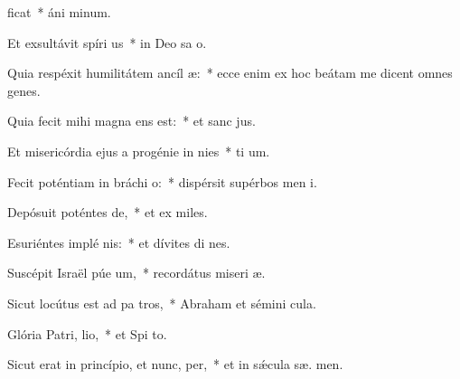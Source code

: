 \item {}ficat~* áni  minum.
\item Et exsultávit spíri us~* in Deo sa o.
\item Quia respéxit humilitátem ancíl æ:~* ecce enim ex hoc beátam me dicent omnes genes.
\item Quia fecit mihi magna  ens est:~* et sanc  jus.
\item Et misericórdia ejus a progénie in nies~* ti um.
\item Fecit poténtiam in bráchi o:~* dispérsit supérbos men  i.
\item Depósuit poténtes  de,~* et ex miles.
\item Esuriéntes implé nis:~* et dívites di nes.
\item Suscépit Israël púe um,~* recordátus miseri æ.
\item Sicut locútus est ad pa tros,~* Abraham et sémini   cula.
\item Glória Patri,  lio,~* et Spi to.
\item Sicut erat in princípio, et nunc,  per,~* et in sǽcula sæ. men.
